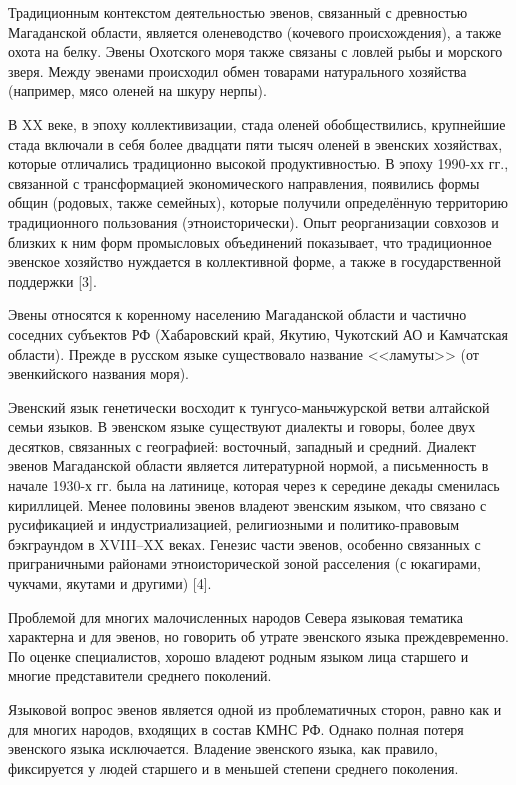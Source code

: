       Традиционным контекстом деятельностью эвенов, связанный с древностью Магаданской области, является оленеводство (кочевого происхождения), а также охота на белку. Эвены Охотского моря также связаны с ловлей рыбы и морского зверя. Между эвенами происходил обмен товарами натурального хозяйства (например, мясо оленей на шкуру нерпы).

      В XX веке, в эпоху коллективизации, стада оленей обобществились, крупнейшие стада включали в себя более двадцати пяти тысяч оленей в эвенских хозяйствах, которые отличались традиционно высокой продуктивностью. В эпоху 1990-хх гг., связанной с трансформацией экономического направления, появились формы общин (родовых, также семейных), которые получили определённую территорию традиционного пользования (этноисторически). Опыт реорганизации совхозов и близких к ним форм промысловых объединений показывает, что традиционное эвенское хозяйство нуждается в коллективной форме, а также в государственной поддержки [3].

      Эвены относятся к коренному населению Магаданской области и частично соседних субъектов РФ (Хабаровский край, Якутию, Чукотский АО и Камчатская области). Прежде в русском языке существовало название <<ламуты>> (от эвенкийского названия моря).

      Эвенский язык генетически восходит к тунгусо-маньчжурской ветви алтайской семьи языков. В эвенском языке существуют диалекты и говоры, более двух десятков, связанных с географией: восточный, западный и средний. Диалект эвенов Магаданской области является литературной нормой, а письменность в начале 1930-х гг. была на латинице, которая через к середине декады сменилась кириллицей. Менее половины эвенов владеют эвенским языком, что связано с русификацией и индустриализацией, религиозными и политико-правовым бэкграундом в XVIII--XX веках. Генезис части эвенов, особенно связанных с приграничными районами этноисторической зоной расселения (с юкагирами, чукчами, якутами и другими) [4].

      Проблемой для многих малочисленных народов Севера языковая тематика характерна и для эвенов, но говорить об утрате эвенского языка преждевременно. По оценке специалистов, хорошо владеют родным языком лица старшего и многие представители среднего поколений.

      Языковой вопрос эвенов является одной из проблематичных сторон, равно как и для многих народов, входящих в состав КМНС РФ. Однако полная потеря эвенского языка исключается. Владение эвенского языка, как правило, фиксируется у людей старшего и в меньшей степени среднего поколения.

